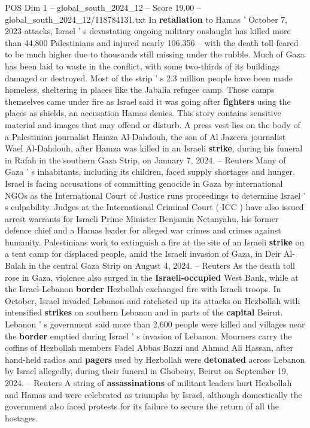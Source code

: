 \begin{textsample}{POS Dim 1 – global\_south\_2024\_12 – Score 19.00 – global\_south\_2024\_12/118784131.txt}  \label{ex:f1_pos_196}
In \textbf{retaliation} to Hamas ' October 7, 2023 attacks, Israel ' s devastating ongoing military onslaught has killed more than 44,800 Palestinians and injured nearly 106,356 -- with the death toll feared to be much higher due to thousands still missing under the rubble.
Much of Gaza has been laid to waste in the conflict, with some two-thirds of its buildings damaged or destroyed.
Most of the strip ' s 2.3 million people have been made homeless, sheltering in places like the Jabalia refugee camp.
Those camps themselves came under fire as Israel said it was going after \textbf{fighters} using the places as shields, an accusation Hamas denies.
This story contains sensitive material and images that may offend or disturb.
A press vest lies on the body of a Palestinian journalist Hamza Al-Dahdouh, the son of Al Jazeera journalist Wael Al-Dahdouh, after Hamza was killed in an Israeli \textbf{strike}, during his funeral in Rafah in the southern Gaza Strip, on January 7, 2024. -- Reuters Many of Gaza ' s inhabitants, including its children, faced supply shortages and hunger.
Israel is facing accusations of committing genocide in Gaza by international NGOs as the International Court of Justice runs proceedings to determine Israel ' s culpability.
Judges at the International Criminal Court ( ICC ) have also issued arrest warrants for Israeli Prime Minister Benjamin Netanyahu, his former defence chief and a Hamas leader for alleged war crimes and crimes against humanity.
Palestinians work to extinguish a fire at the site of an Israeli \textbf{strike} on a tent camp for displaced people, amid the Israeli invasion of Gaza, in Deir Al-Balah in the central Gaza Strip on August 4, 2024. -- Reuters As the death toll rose in Gaza, violence also surged in the \textbf{Israeli-occupied} West Bank, while at the Israel-Lebanon \textbf{border} Hezbollah exchanged fire with Israeli troops.
In October, Israel invaded Lebanon and ratcheted up its attacks on Hezbollah with intensified \textbf{strikes} on southern Lebanon and in parts of the \textbf{capital} Beirut.
Lebanon ' s government said more than 2,600 people were killed and villages near the \textbf{border} emptied during Israel ' s invasion of Lebanon.
Mourners carry the coffins of Hezbollah members Fadel Abbas Bazzi and Ahmad Ali Hassan, after hand-held radios and \textbf{pagers} used by Hezbollah were \textbf{detonated} across Lebanon by Israel allegedly, during their funeral in Ghobeiry, Beirut on September 19, 2024. -- Reuters A string of \textbf{assassinations} of militant leaders hurt Hezbollah and Hamas and were celebrated as triumphs by Israel, although domestically the government also faced protests for its failure to secure the return of all the hostages.

\end{textsample}
